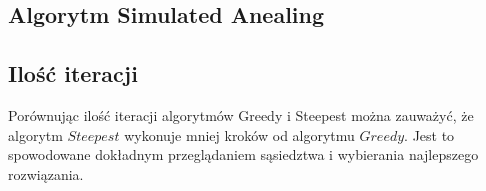 \subsection {Algorytm Simulated Anealing}

\subsection{Ilość iteracji}

Porównując ilość iteracji algorytmów Greedy i Steepest można zauważyć,
że algorytm $Steepest$ wykonuje mniej kroków od algorytmu $Greedy$.
Jest to spowodowane dokładnym przeglądaniem sąsiedztwa i wybierania
najlepszego rozwiązania.
